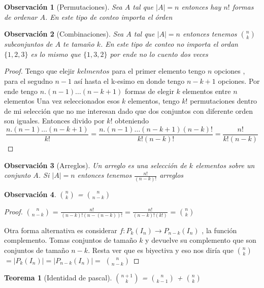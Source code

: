 \documentclass{article}
\theoremstyle{break}
\newtheorem{theorem}{Teorema}[section]
\newtheorem*{remark}{Observación}
\begin{document}
    \begin{remark}[Permutaciones]
        Sea $A$ tal que $|A| = n$ entonces hay $n!$ formas de ordenar $A$. En este tipo de conteo importa el órden
    \end{remark}

    \begin{remark}[Combinaciones]
	    Sea $A$ tal que $|A| = n$ entonces tenemos $\binom{n}{k}$ subconjuntos de $A$ te tamaño $k$. En este tipo de conteo
        no importa el ordan $\{1,2,3\}$ es lo mismo que $\{1,3,2\}$ por ende no lo cuento dos veces
    \end{remark}
    
    \begin{proof}
        Tengo que elejir $k elmentos$ para el primer elemento tengo $n$ opciones , para el segudno $n-1$ así hasta el 
        k-esimo en donde tengo $n-k+1$ opciones. Por ende tengo $n.(n-1)\ldots(n-k+1)$ formas de elegir $k$ elementos entre $n$ elementos
        Una vez seleccionados esos $k$ elementos, tengo $k!$ permutaciones dentro de mi selección que no me interesan dado que dos conjuntos
        con diferente orden son iguales. Entonces divido por $k!$ obteniendo 
        $$\frac{n.(n-1)\ldots(n-k+1)}{k!} = \frac{n.(n-1)\ldots(n-k+1)(n-k)!}{k!(n-k)!} = \frac{n!}{k!(n-k)}$$
    \end{proof}

    \begin{remark}[Arreglos]
        Un arreglo es una selección de $k$ elementos sobre un conjunto $A$. Si $|A|=n$ entonces tenemos $\frac{n!}{(n-k)!}$ arreglos
    \end{remark}

    \begin{remark}
	    $\binom{n}{k}$ = $ \binom{n}{n-k}$
    \end{remark}
    \begin{proof}
        $\binom{n}{n-k}$ = $\frac{n!}{(n-k)!(n-(n-k))!} = \frac{n!}{(n-k)!(k!)}$ = $\binom{n}{k}$        

        Otra forma alternativa es considerar $f: P_{k} (I_n) \rightarrow P_{n-k} (I_n)$ , la función complemento.
        Tomas conjuntos de tamaño $k$ y devuelve su complemento que son conjuntos de tamaño $n-k$. Resta ver que es biyectiva
        y eso nos diría que $\binom{n}{k}$   $=|P_{k}(I_n)| = |P_{n - k}(I_n)| = $ $\binom{n}{n-k}$  

    \end{proof}
    
    \begin{theorem}[Identidad de pascal]

	    $\binom{n+1}{k}$  = $\binom{n}{k-1}$   + $\binom{n}{k}$   
    \end{theorem}
\end{document}
